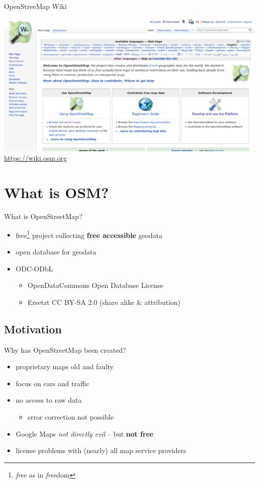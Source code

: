 \documentclass{beamer}
\begin{document}
	\begin{frame}{OpenStreeMap Wiki}
		\begin{center}
			\includegraphics[height=0.7\textheight]{images/osm-wiki}\\
			\url{https://wiki.osm.org}
		\end{center}
	\end{frame}

	\section{What is OSM?}
	
	\begin{frame}{What is OpenStreetMap?}
		\begin{itemize}
			\item free\footnote{\textit{free} as in \textit{free}dom} project collecting \textbf{free accessible} geodata
			\item open database for geodata
			\item ODC-ODbL
			\begin{itemize}
				\item OpenDataCommons Open Database License
				\item Ersetzt CC BY-SA 2.0 {\tiny (share alike \& attribution)}
			\end{itemize}
		\end{itemize}
	\end{frame}

	\subsection{Motivation}
	
	\begin{frame}
		Why has OpenStreetMap been created?
		\begin{itemize}
			\item proprietary maps old and faulty
			\item focus on cars and traffic
			\item no access to raw data
			\begin{itemize}
				\item error correction not possible
			\end{itemize}
			\item Google Maps \textit{not directly evil} -- but \textbf{not free}
			\item license problems with (nearly) all map service providers
		\end{itemize}
	\end{frame}
\end{document}
